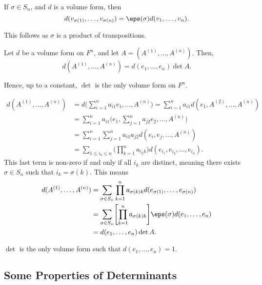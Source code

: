 \documentclass[12pt]{article}
\begin{document}
\begin{corollary}
	If $\sigma \in S_n$, and $d$ is a volume form, then
	\[
		d(v_{\sigma(1)}, \ldots, v_{\sigma(n)}) = \eps(\sigma) d(v_1, \ldots, v_n)
	.\]
\end{corollary}

This follows as $\sigma$ is a product of transpositions.

\begin{theorem}
	Let $d$ be a volume form on $F^{n}$, and let $A = (A^{(1)}, \ldots, A^{(n)})$. Then,
	\[
		d(A^{(1)}, \ldots, A^{(n)}) = d(e_1, \ldots, e_n) \det A
	.\]
\end{theorem}

Hence, up to a constant, $\det$ is the only volume form on $F^{n}$.

\begin{proofbox}
	\begin{align*}
		d(A^{(1)}, \ldots, A^{(n)}) &= d \Biggl( \sum_{i = 1}^{n} a_{i1}e_1, \ldots, A^{(n)} \Biggr) = \sum_{i = 1}^{n} a_{i1} d(e_1, A^{(2)}, \ldots, A^{(n)}) \\
					    &= \sum_{i = 1}^{n} a_{i1} \Biggl( e_1, \sum_{j = 1}^{n} a_{j2}e_2, \ldots, A^{(n)}\Biggr) \\
					    &= \sum_{i = 1}^{n} \sum_{j = 1}^{n} a_{i1}a_{j2} d(e_i, e_j, \ldots, A^{(n)}) \\
					    &= \sum_{1 \leq i_k \leq n} \Biggl( \prod_{k = 1}^{n} a_{i_k k} \Biggr) d(e_{i_1}, e_{i_2}, \ldots, e_{i_n}).
	\end{align*}
	This last term is non-zero if and only if all $i_k$ are distinct, meaning there exists $\sigma \in S_n$ such that $i_k = \sigma(k)$. This means
	\begin{align*}
		d(A^{(1)}, \ldots, A^{(n)}) &= \sum_{\sigma \in S_n} \prod_{k = 1}^{n} a_{\sigma(k) k}d(e_{\sigma(1)}, \ldots, e_{\sigma(n)}) \\
					    &= \sum_{\sigma \in S_n} \Biggl[ \prod_{k = 1}^{n} a_{\sigma(k) k} \Biggr] \eps(\sigma) d(e_1, \ldots, e_n) \\
					    &= d(e_1, \ldots, e_n) \det A.
	\end{align*}
\end{proofbox}

\begin{corollary}
	$\det$ is the only volume form such that $d(e_1, \ldots, e_n) = 1$.
\end{corollary}

\subsection{Some Properties of Determinants}%
\label{sub:some_properties_of_determinants}
\end{document}

